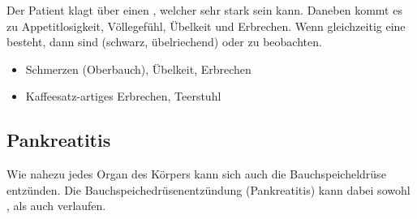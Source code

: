 {Der Patient klagt über einen
, welcher sehr stark sein
kann. Daneben kommt es zu Appetitlosigkeit, Völlegefühl,
Übelkeit und Erbrechen. Wenn gleichzeitig eine 
besteht, dann sind 
(schwarz, übelriechend) oder  zu beobachten. 
}{
\begin{itemize}
    \item Schmerzen (Oberbauch), Übelkeit, Erbrechen
    \item Kaffeesatz-artiges Erbrechen, Teerstuhl
\end{itemize}
}{}{}{}


%   

\subsection{Pankreatitis}

\label{topic:pankreatitis}

Wie nahezu jedes Organ des Körpers kann sich auch die
Bauchspeicheldrüse entzünden. Die
Bauchspeichedrüsenentzündung (Pankreatitis) kann dabei
sowohl , als auch  verlaufen. 


